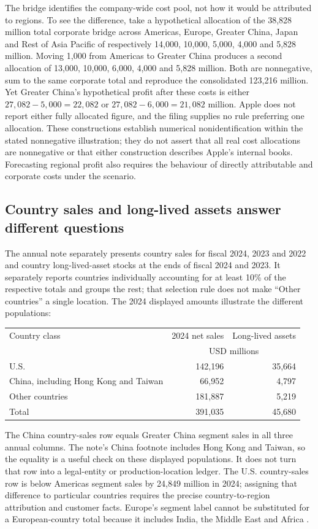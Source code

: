 The bridge identifies the company-wide cost pool, not how it would be
attributed to regions. To see the difference, take a hypothetical allocation
of the 38,828 million total corporate bridge across Americas, Europe, Greater
China, Japan and Rest of Asia Pacific of respectively 14,000, 10,000, 5,000,
4,000 and 5,828 million. Moving 1,000 from Americas to Greater China produces
a second allocation of 13,000, 10,000, 6,000, 4,000 and 5,828 million.
Both are nonnegative, sum to the same corporate total and reproduce the
consolidated 123,216 million. Yet Greater China's hypothetical profit after
these costs is either $27{,}082-5{,}000=22{,}082$ or
$27{,}082-6{,}000=21{,}082$ million. Apple does not report either fully
allocated figure, and the filing supplies no rule preferring one allocation.
These constructions establish numerical nonidentification within the stated
nonnegative illustration; they do not assert that all real cost allocations
are nonnegative or that either construction describes Apple's internal books.
Forecasting regional profit also requires the behaviour of directly
attributable and corporate costs under the scenario.

\subsection{Country sales and long-lived assets answer different questions}

The annual note separately presents country sales for fiscal 2024, 2023 and
2022 and country long-lived-asset stocks at the ends of fiscal 2024 and 2023.
It separately reports countries individually accounting for at least 10\% of
the respective totals and groups the rest; that selection rule does not make
``Other countries'' a single location. The 2024 displayed amounts illustrate
the different populations:
\begin{center}
\begin{tabular}{lrr}
\toprule
Country class & 2024 net sales & Long-lived assets\\
& \multicolumn{2}{c}{USD millions}\\\midrule
U.S. & 142,196 & 35,664\\
China, including Hong Kong and Taiwan & 66,952 & 4,797\\
Other countries & 181,887 & 5,219\\\midrule
Total & 391,035 & 45,680\\\bottomrule
\end{tabular}
\end{center}
The China country-sales row equals Greater China segment sales in all three
annual columns. The note's China footnote includes Hong Kong and Taiwan, so
the equality is a useful check on these displayed populations. It does not
turn that row into a legal-entity or production-location ledger. The U.S.
country-sales row is below Americas segment sales by 24,849 million in 2024;
assigning that difference to particular countries requires the precise
country-to-region attribution and customer facts. Europe's segment label
cannot be substituted for a European-country total because it includes India,
the Middle East and Africa \citep[Note 13, printed pp.~46--47]{apple2024}.

